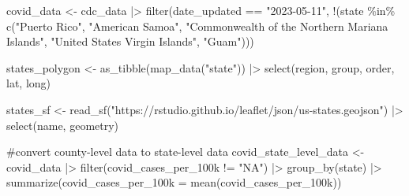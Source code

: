 \documentclass[
  letterpaper,
  DIV=11,
  numbers=noendperiod]{scrartcl}
\newenvironment{Shaded}{\begin{snugshade}}{\end{snugshade}}
\newcommand{\AttributeTok}[1]{\textcolor[rgb]{0.40,0.45,0.13}{#1}}
\newcommand{\CommentTok}[1]{\textcolor[rgb]{0.37,0.37,0.37}{#1}}
\newcommand{\FunctionTok}[1]{\textcolor[rgb]{0.28,0.35,0.67}{#1}}
\newcommand{\NormalTok}[1]{\textcolor[rgb]{0.00,0.23,0.31}{#1}}
\newcommand{\OtherTok}[1]{\textcolor[rgb]{0.00,0.23,0.31}{#1}}
\newcommand{\SpecialCharTok}[1]{\textcolor[rgb]{0.37,0.37,0.37}{#1}}
\newcommand{\StringTok}[1]{\textcolor[rgb]{0.13,0.47,0.30}{#1}}
\begin{document}
\begin{Shaded}
\begin{Highlighting}[]
\NormalTok{covid\_data }\OtherTok{\textless{}{-}}\NormalTok{ cdc\_data }\SpecialCharTok{|\textgreater{}}
  \FunctionTok{filter}\NormalTok{(date\_updated }\SpecialCharTok{==} \StringTok{"2023{-}05{-}11"}\NormalTok{, }
         \SpecialCharTok{!}\NormalTok{(state }\SpecialCharTok{\%in\%} \FunctionTok{c}\NormalTok{(}\StringTok{"Puerto Rico"}\NormalTok{, }
                        \StringTok{"American Samoa"}\NormalTok{, }
                        \StringTok{"Commonwealth of the Northern Mariana Islands"}\NormalTok{, }
                        \StringTok{"United States Virgin Islands"}\NormalTok{, }
                        \StringTok{"Guam"}\NormalTok{)))}
\end{Highlighting}
\end{Shaded}

\begin{Shaded}
\begin{Highlighting}[]
\NormalTok{states\_polygon }\OtherTok{\textless{}{-}} \FunctionTok{as\_tibble}\NormalTok{(}\FunctionTok{map\_data}\NormalTok{(}\StringTok{"state"}\NormalTok{)) }\SpecialCharTok{|\textgreater{}}
  \FunctionTok{select}\NormalTok{(region, group, order, lat, long)}

\NormalTok{states\_sf }\OtherTok{\textless{}{-}} \FunctionTok{read\_sf}\NormalTok{(}\StringTok{"https://rstudio.github.io/leaflet/json/us{-}states.geojson"}\NormalTok{) }\SpecialCharTok{|\textgreater{}}
  \FunctionTok{select}\NormalTok{(name, geometry)}
\end{Highlighting}
\end{Shaded}

\begin{Shaded}
\begin{Highlighting}[]
\CommentTok{\#convert county{-}level data to state{-}level data}
\NormalTok{covid\_state\_level\_data }\OtherTok{\textless{}{-}}\NormalTok{ covid\_data }\SpecialCharTok{|\textgreater{}}
  \FunctionTok{filter}\NormalTok{(covid\_cases\_per\_100k }\SpecialCharTok{!=} \StringTok{"NA"}\NormalTok{) }\SpecialCharTok{|\textgreater{}}
  \FunctionTok{group\_by}\NormalTok{(state) }\SpecialCharTok{|\textgreater{}}
  \FunctionTok{summarize}\NormalTok{(}\AttributeTok{covid\_cases\_per\_100k =} \FunctionTok{mean}\NormalTok{(covid\_cases\_per\_100k))}
\end{Highlighting}
\end{Shaded}
\end{document}
